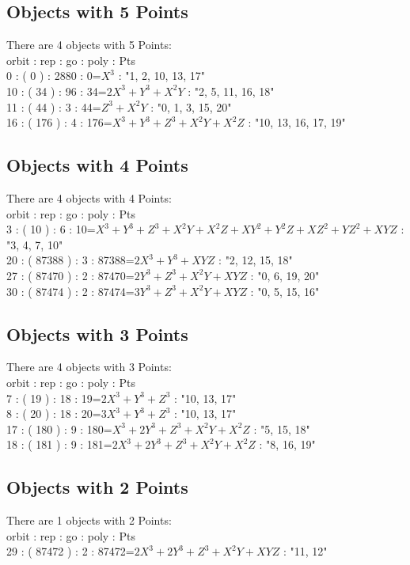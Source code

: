 \documentclass[12pt]{article}
\begin{document}
{\subsection*{Objects with 5 Points}
There are 4 objects with 5 Points: \\
orbit : rep : go : poly : Pts\\
0 : ( 0 ) : 2880 : 0=$X^3$ : "1, 2, 10, 13, 17"\\
10 : ( 34 ) : 96 : 34=$2X^3 + Y^3 + X^2Y$ : "2, 5, 11, 16, 18"\\
11 : ( 44 ) : 3 : 44=$Z^3 + X^2Y$ : "0, 1, 3, 15, 20"\\
16 : ( 176 ) : 4 : 176=$X^3 + Y^3 + Z^3 + X^2Y + X^2Z$ : "10, 13, 16, 17, 19"\\
\subsection*{Objects with 4 Points}
There are 4 objects with 4 Points: \\
orbit : rep : go : poly : Pts\\
3 : ( 10 ) : 6 : 10=$X^3 + Y^3 + Z^3 + X^2Y + X^2Z + XY^2 + Y^2Z + XZ^2 + YZ^2 + XYZ$ : "3, 4, 7, 10"\\
20 : ( 87388 ) : 3 : 87388=$2X^3 + Y^3 + XYZ$ : "2, 12, 15, 18"\\
27 : ( 87470 ) : 2 : 87470=$2Y^3 + Z^3 + X^2Y + XYZ$ : "0, 6, 19, 20"\\
30 : ( 87474 ) : 2 : 87474=$3Y^3 + Z^3 + X^2Y + XYZ$ : "0, 5, 15, 16"\\
\subsection*{Objects with 3 Points}
There are 4 objects with 3 Points: \\
orbit : rep : go : poly : Pts\\
7 : ( 19 ) : 18 : 19=$2X^3 + Y^3 + Z^3$ : "10, 13, 17"\\
8 : ( 20 ) : 18 : 20=$3X^3 + Y^3 + Z^3$ : "10, 13, 17"\\
17 : ( 180 ) : 9 : 180=$X^3 + 2Y^3 + Z^3 + X^2Y + X^2Z$ : "5, 15, 18"\\
18 : ( 181 ) : 9 : 181=$2X^3 + 2Y^3 + Z^3 + X^2Y + X^2Z$ : "8, 16, 19"\\
\subsection*{Objects with 2 Points}
There are 1 objects with 2 Points: \\
orbit : rep : go : poly : Pts\\
29 : ( 87472 ) : 2 : 87472=$2X^3 + 2Y^3 + Z^3 + X^2Y + XYZ$ : "11, 12"\\
}
\end{document}
